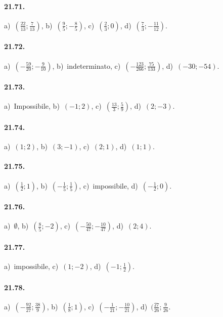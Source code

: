 \paragraph{21.71.} a)~$\left(\frac{22}{13};\frac{7}{13}\right)$, \quad b)~$\left(\frac{9}{5};-\frac{8}{5}\right)$,
\quad c)~$(\frac{2}{3};0)$, \quad d)~$\left(\frac{7}{3};-\frac{11}{12}\right)$.

\paragraph{21.72.} a)~$\left(-{\frac{59}{20}};-\frac{9}{10}\right)$, \quad b)~indeterminato, \quad c)~$(-{\frac{123}{266}};\frac{75}{133})$, \quad d)~$(-30;-54)$.

\paragraph{21.73.} a)~Impossibile, \quad b)~$(-1;2)$, \quad c)~$\left(\frac{13}{3};\frac{5}{9}\right)$, \quad d)~$(2;-3)$.

\paragraph{21.74.} a)~$(1;2)$, \quad b)~$(3;-1)$, \quad c)~$(2;1)$, \quad d)~$(1;1)$.

\paragraph{21.75.} a)~$\left(\frac{1}{2};1\right)$, \quad b)~$\left(-{\frac{1}{5}};\frac{1}{5}\right)$,
\quad c)~impossibile, \quad d)~$\left(-{\frac{1}{2}};0\right)$.

\paragraph{21.76.} a)~$\emptyset $, \quad b)~$\left(\frac{8}{5};-2\right)$, \quad c)~$(-\frac{50}{47};-\frac{10}{47})$,
\quad d)~$(2;4)$.

\paragraph{21.77.} a)~impossibile, \quad c)~$(1;-2)$, \quad d)~$(-1;\frac{1}{2})$.

\paragraph{21.78.} a)~$(-{\frac{92}{27}};\frac{38}{9})$, \quad b)~$(\frac{1}{8};1)$, \quad c)~$(-{\frac{1}{21}};-{\frac{10}{21}})$, \quad d)~$(\frac{27}{26};\frac{9}{26}$.

